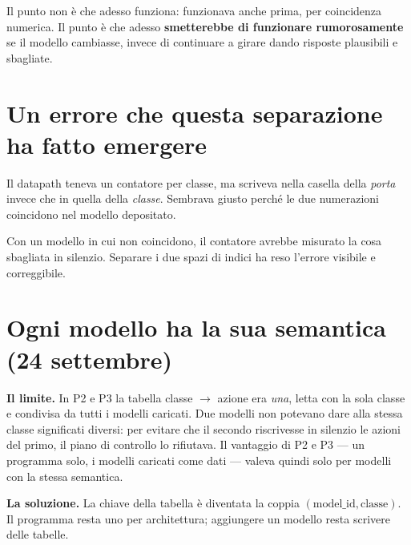 \documentclass[11pt,a4paper,oneside]{report}
\begin{document}
\begin{lezione}
Il punto non è che adesso funziona: funzionava anche prima, per coincidenza
numerica. Il punto è che adesso \textbf{smetterebbe di funzionare rumorosamente}
se il modello cambiasse, invece di continuare a girare dando risposte
plausibili e sbagliate.
\end{lezione}

\section{Un errore che questa separazione ha fatto emergere}

Il datapath teneva un contatore per classe, ma scriveva nella casella
della \emph{porta} invece che in quella della \emph{classe}. Sembrava
giusto perché le due numerazioni coincidono nel modello depositato.

Con un modello in cui non coincidono, il contatore avrebbe misurato la cosa
sbagliata in silenzio. Separare i due spazi di indici ha reso l'errore visibile
e correggibile.

\section{Ogni modello ha la sua semantica (24 settembre)}

\textbf{Il limite.} In P2 e P3 la tabella classe $\to$ azione era \emph{una}, letta
con la sola classe e condivisa da tutti i modelli caricati. Due modelli non
potevano dare alla stessa classe significati diversi: per evitare che il secondo
riscrivesse in silenzio le azioni del primo, il piano di controllo lo rifiutava.
Il vantaggio di P2 e P3 --- un programma solo, i modelli caricati come dati ---
valeva quindi solo per modelli con la stessa semantica.

\textbf{La soluzione.} La chiave della tabella è diventata la coppia
$(\text{model\_id}, \text{classe})$. Il programma resta uno per architettura;
aggiungere un modello resta scrivere delle tabelle.

\begin{center}
\end{center}
\end{document}
